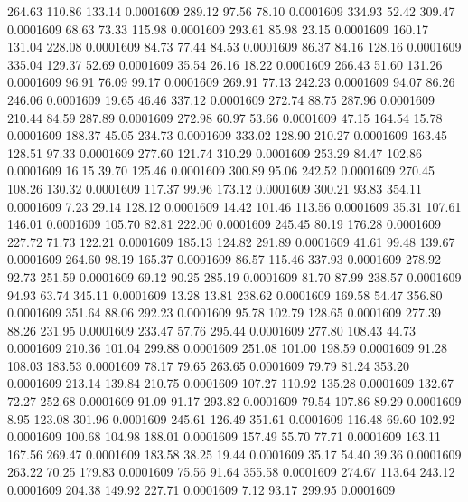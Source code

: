  264.63  110.86  133.14   0.0001609
 289.12   97.56   78.10   0.0001609
 334.93   52.42  309.47   0.0001609
  68.63   73.33  115.98   0.0001609
 293.61   85.98   23.15   0.0001609
 160.17  131.04  228.08   0.0001609
  84.73   77.44   84.53   0.0001609
  86.37   84.16  128.16   0.0001609
 335.04  129.37   52.69   0.0001609
  35.54   26.16   18.22   0.0001609
 266.43   51.60  131.26   0.0001609
  96.91   76.09   99.17   0.0001609
 269.91   77.13  242.23   0.0001609
  94.07   86.26  246.06   0.0001609
  19.65   46.46  337.12   0.0001609
 272.74   88.75  287.96   0.0001609
 210.44   84.59  287.89   0.0001609
 272.98   60.97   53.66   0.0001609
  47.15  164.54   15.78   0.0001609
 188.37   45.05  234.73   0.0001609
 333.02  128.90  210.27   0.0001609
 163.45  128.51   97.33   0.0001609
 277.60  121.74  310.29   0.0001609
 253.29   84.47  102.86   0.0001609
  16.15   39.70  125.46   0.0001609
 300.89   95.06  242.52   0.0001609
 270.45  108.26  130.32   0.0001609
 117.37   99.96  173.12   0.0001609
 300.21   93.83  354.11   0.0001609
   7.23   29.14  128.12   0.0001609
  14.42  101.46  113.56   0.0001609
  35.31  107.61  146.01   0.0001609
 105.70   82.81  222.00   0.0001609
 245.45   80.19  176.28   0.0001609
 227.72   71.73  122.21   0.0001609
 185.13  124.82  291.89   0.0001609
  41.61   99.48  139.67   0.0001609
 264.60   98.19  165.37   0.0001609
  86.57  115.46  337.93   0.0001609
 278.92   92.73  251.59   0.0001609
  69.12   90.25  285.19   0.0001609
  81.70   87.99  238.57   0.0001609
  94.93   63.74  345.11   0.0001609
  13.28   13.81  238.62   0.0001609
 169.58   54.47  356.80   0.0001609
 351.64   88.06  292.23   0.0001609
  95.78  102.79  128.65   0.0001609
 277.39   88.26  231.95   0.0001609
 233.47   57.76  295.44   0.0001609
 277.80  108.43   44.73   0.0001609
 210.36  101.04  299.88   0.0001609
 251.08  101.00  198.59   0.0001609
  91.28  108.03  183.53   0.0001609
  78.17   79.65  263.65   0.0001609
  79.79   81.24  353.20   0.0001609
 213.14  139.84  210.75   0.0001609
 107.27  110.92  135.28   0.0001609
 132.67   72.27  252.68   0.0001609
  91.09   91.17  293.82   0.0001609
  79.54  107.86   89.29   0.0001609
   8.95  123.08  301.96   0.0001609
 245.61  126.49  351.61   0.0001609
 116.48   69.60  102.92   0.0001609
 100.68  104.98  188.01   0.0001609
 157.49   55.70   77.71   0.0001609
 163.11  167.56  269.47   0.0001609
 183.58   38.25   19.44   0.0001609
  35.17   54.40   39.36   0.0001609
 263.22   70.25  179.83   0.0001609
  75.56   91.64  355.58   0.0001609
 274.67  113.64  243.12   0.0001609
 204.38  149.92  227.71   0.0001609
   7.12   93.17  299.95   0.0001609
